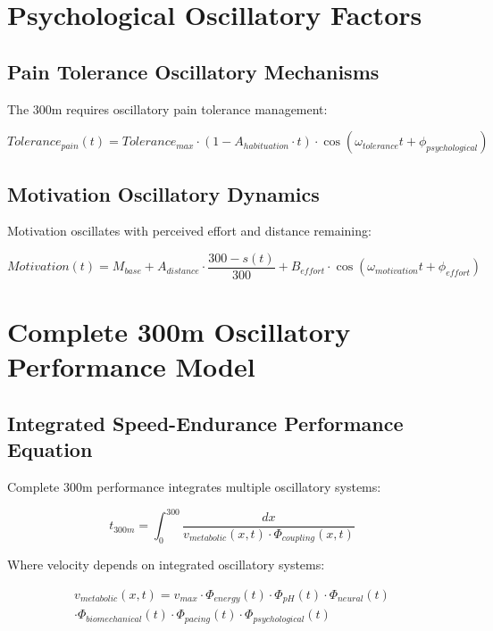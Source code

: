 \documentclass[12pt]{article}
\begin{document}
\section{Psychological Oscillatory Factors}

\subsection{Pain Tolerance Oscillatory Mechanisms}

The 300m requires oscillatory pain tolerance management:

\begin{equation}
Tolerance_{pain}(t) = Tolerance_{max} \cdot \left(1 - A_{habituation} \cdot t\right) \cdot \cos(\omega_{tolerance}t + \phi_{psychological})
\end{equation}

\subsection{Motivation Oscillatory Dynamics}

Motivation oscillates with perceived effort and distance remaining:

\begin{equation}
Motivation(t) = M_{base} + A_{distance} \cdot \frac{300 - s(t)}{300} + B_{effort} \cdot \cos(\omega_{motivation}t + \phi_{effort})
\end{equation}

\section{Complete 300m Oscillatory Performance Model}

\subsection{Integrated Speed-Endurance Performance Equation}

Complete 300m performance integrates multiple oscillatory systems:

\begin{equation}
t_{300m} = \int_0^{300} \frac{dx}{v_{metabolic}(x,t) \cdot \Phi_{coupling}(x,t)}
\end{equation}

Where velocity depends on integrated oscillatory systems:

\begin{multline}
v_{metabolic}(x,t) = v_{max} \cdot \Phi_{energy}(t) \cdot \Phi_{pH}(t) \cdot \Phi_{neural}(t) \\
\cdot \Phi_{biomechanical}(t) \cdot \Phi_{pacing}(t) \cdot \Phi_{psychological}(t)
\end{multline}
\end{document}
